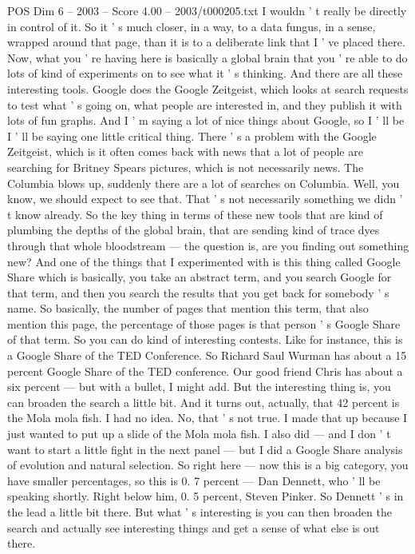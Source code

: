 \begin{textsample}{POS Dim 6 – 2003 – Score 4.00 – 2003/t000205.txt}
I wouldn ' t really be directly in control of it.
So it ' s much closer, in a way, to a data fungus, in a sense, wrapped around that page, than it is to a deliberate link that I ' ve placed there.
Now, what you ' re having here is basically a global brain that you ' re able to do lots of kind of experiments on to see what it ' s thinking.
And there are all these interesting tools.
Google does the Google Zeitgeist, which looks at search requests to test what ' s going on, what people are interested in, and they publish it with lots of fun graphs.
And I ' m saying a lot of nice things about Google, so I ' ll be I ' ll be saying one little critical thing.
There ' s a problem with the Google Zeitgeist, which is it often comes back with news that a lot of people are searching for Britney Spears pictures, which is not necessarily news.
The Columbia blows up, suddenly there are a lot of searches on Columbia.
Well, you know, we should expect to see that.
That ' s not necessarily something we didn ' t know already.
So the key thing in terms of these new tools that are kind of plumbing the depths of the global brain, that are sending kind of trace dyes through that whole bloodstream — the question is, are you finding out something new?
And one of the things that I experimented with is this thing called Google Share which is basically, you take an abstract term, and you search Google for that term, and then you search the results that you get back for somebody ' s name.
So basically, the number of pages that mention this term, that also mention this page, the percentage of those pages is that person ' s Google Share of that term.
So you can do kind of interesting contests.
Like for instance, this is a Google Share of the TED Conference.
So Richard Saul Wurman has about a 15 percent Google Share of the TED conference.
Our good friend Chris has about a six percent — but with a bullet, I might add.
But the interesting thing is, you can broaden the search a little bit.
And it turns out, actually, that 42 percent is the Mola mola fish.
I had no idea.
No, that ' s not true.
I made that up because I just wanted to put up a slide of the Mola mola fish.
I also did — and I don ' t want to start a little fight in the next panel — but I did a Google Share analysis of evolution and natural selection.
So right here — now this is a big category, you have smaller percentages, so this is 0. 7 percent — Dan Dennett, who ' ll be speaking shortly.
Right below him, 0. 5 percent, Steven Pinker.
So Dennett ' s in the lead a little bit there.
But what ' s interesting is you can then broaden the search and actually see interesting things and get a sense of what else is out there.

\end{textsample}
